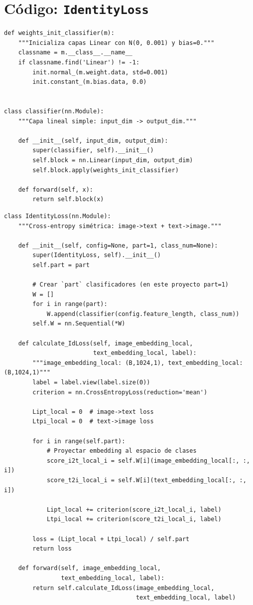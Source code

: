 \section{Código: \texttt{IdentityLoss}}

\begin{verbatim}
def weights_init_classifier(m):
    """Inicializa capas Linear con N(0, 0.001) y bias=0."""
    classname = m.__class__.__name__
    if classname.find('Linear') != -1:
        init.normal_(m.weight.data, std=0.001)
        init.constant_(m.bias.data, 0.0)


class classifier(nn.Module):
    """Capa lineal simple: input_dim -> output_dim."""

    def __init__(self, input_dim, output_dim):
        super(classifier, self).__init__()
        self.block = nn.Linear(input_dim, output_dim)
        self.block.apply(weights_init_classifier)

    def forward(self, x):
        return self.block(x)
\end{verbatim}

\begin{verbatim}
class IdentityLoss(nn.Module):
    """Cross-entropy simétrica: image->text + text->image."""

    def __init__(self, config=None, part=1, class_num=None):
        super(IdentityLoss, self).__init__()
        self.part = part

        # Crear `part` clasificadores (en este proyecto part=1)
        W = []
        for i in range(part):
            W.append(classifier(config.feature_length, class_num))
        self.W = nn.Sequential(*W)

    def calculate_IdLoss(self, image_embedding_local,
                         text_embedding_local, label):
        """image_embedding_local: (B,1024,1), text_embedding_local: (B,1024,1)"""
        label = label.view(label.size(0))
        criterion = nn.CrossEntropyLoss(reduction='mean')

        Lipt_local = 0  # image->text loss
        Ltpi_local = 0  # text->image loss

        for i in range(self.part):
            # Proyectar embedding al espacio de clases
            score_i2t_local_i = self.W[i](image_embedding_local[:, :, i])
            score_t2i_local_i = self.W[i](text_embedding_local[:, :, i])

            Lipt_local += criterion(score_i2t_local_i, label)
            Ltpi_local += criterion(score_t2i_local_i, label)

        loss = (Lipt_local + Ltpi_local) / self.part
        return loss

    def forward(self, image_embedding_local,
                text_embedding_local, label):
        return self.calculate_IdLoss(image_embedding_local,
                                     text_embedding_local, label)
\end{verbatim}

